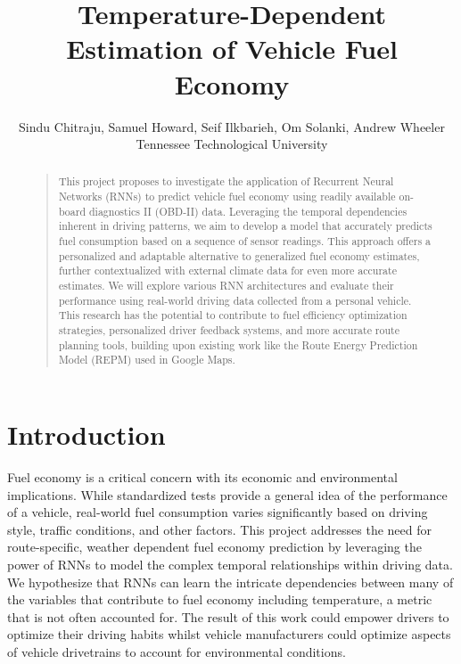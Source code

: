 \documentclass[letterpaper]{article}
\begin{document}

\nocopyright
\title{Temperature-Dependent Estimation of Vehicle Fuel Economy}
\author{Sindu Chitraju, Samuel Howard, Seif Ilkbarieh, Om Solanki, Andrew Wheeler\\
Tennessee Technological University
}

\maketitle

\begin{abstract}
\begin{quote}
    This project proposes to investigate the application of Recurrent Neural Networks (RNNs) to predict vehicle fuel economy using readily available on-board diagnostics II (OBD-II) data. 
    Leveraging the temporal dependencies inherent in driving patterns, we aim to develop a model that accurately predicts fuel consumption based on a sequence of sensor readings. 
    This approach offers a personalized and adaptable alternative to generalized fuel economy estimates, further contextualized with external climate data for even more accurate estimates.
    We will explore various RNN architectures and evaluate their performance using real-world driving data collected from a personal vehicle. 
    This research has the potential to contribute to fuel efficiency optimization strategies, personalized driver feedback systems, and more accurate route planning tools, building upon existing work like the Route Energy Prediction Model (REPM) used in Google Maps. 
\end{quote}
\end{abstract}

\section{Introduction}

\noindent Fuel economy is a critical concern with its economic and environmental implications. 
While standardized tests provide a general idea of the performance of a vehicle, real-world fuel consumption varies significantly based on driving style, traffic conditions, and other factors.
This project addresses the need for route-specific, weather dependent fuel economy prediction by leveraging the power of RNNs to model the complex temporal relationships within driving data.
We hypothesize that RNNs can learn the intricate dependencies between many of the variables that contribute to fuel economy including temperature, a metric that is not often accounted for.
The result of this work could empower drivers to optimize their driving habits whilst vehicle manufacturers could optimize aspects of vehicle drivetrains to account for environmental conditions.



 

\end{document}
